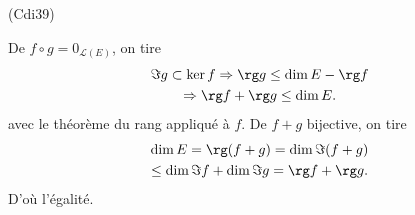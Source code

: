 \begin{tiny}(Cdi39)\end{tiny} De $f \circ g = 0_{\mathcal{L}(E)}$, on tire
\begin{multline*}
 \Im g \subset \ker f 
 \Rightarrow \rg g \leq \dim E - \rg f \\
 \Rightarrow \rg f + \rg g  \leq \dim E.
\end{multline*}
avec le théorème du rang appliqué à $f$. De $f+g$ bijective, on tire
\begin{multline*}
 \dim E = \rg(f+g) = \dim \Im(f+g)\\
 \leq \dim \Im f + \dim \Im g 
 = \rg f + \rg g.
\end{multline*}
D'où l'égalité.